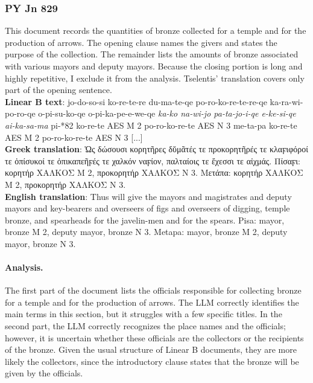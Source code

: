\subsubsection{PY Jn 829}
This document records the quantities of bronze collected for a temple and for the production of arrows.
The opening clause names the givers and states the purpose of the collection.
The remainder lists the amounts of bronze associated with various mayors and deputy mayors.
Because the closing portion is long and highly repetitive, I exclude it from the analysis.
Tselentis’ translation covers only part of the opening sentence. \\
\textbf{Linear B text}: jo-do-so-si ko-re-te-re du-ma-te-qe po-ro-ko-re-te-re-qe ka-ra-wi-po-ro-qe o-pi-su-ko-qe o-pi-ka-pe-e-we-qe \textit{ka-ko na-wi-jo pa-ta-jo-i-qe e-ke-si-qe ai-ka-sa-ma} pi-*82 ko-re-te AES M 2 po-ro-ko-re-te AES N 3 me-ta-pa ko-re-te AES M 2 po-ro-ko-re-te AES N 3 [...] \\
\textbf{Greek translation}: \textgreek{Ὡς δώσουσι κορητῆρες δῠμᾶτές τε προκορητῆρές τε κλαϝιφόροί τε ὀπίσυκοί τε ὀπικαπεῆϝές τε χαλκόν ναϝίον, παλταίοις τε ἔχεσσι τε αἰχμάς. Πίσαϝι: κορητήρ ΧΑΛΚΟΣ M 2, προκορητήρ ΧΑΛΚΟΣ N 3. Μετάπα: κορητήρ ΧΑΛΚΟΣ M 2, προκορητήρ ΧΑΛΚΟΣ N 3.} \\
\textbf{English translation}: Thus will give the mayors and magistrates and deputy mayors and key-bearers and overseers of figs and overseers of digging, temple bronze, and spearheads for the javelin-men and for the spears. Pisa: mayor, bronze M 2, deputy mayor, bronze N 3. Metapa: mayor, bronze M 2, deputy mayor, bronze N 3. 

\paragraph{Analysis.}
The first part of the document lists the officials responsible for collecting bronze for a temple and for the production of arrows.
The LLM correctly identifies the main terms in this section, but it struggles with a few specific titles.
In the second part, the LLM correctly recognizes the place names and the officials; however, it is uncertain whether these officials are the collectors or the recipients of the bronze.
Given the usual structure of Linear B documents, they are more likely the collectors, since the introductory clause states that the bronze will be given by the officials.

